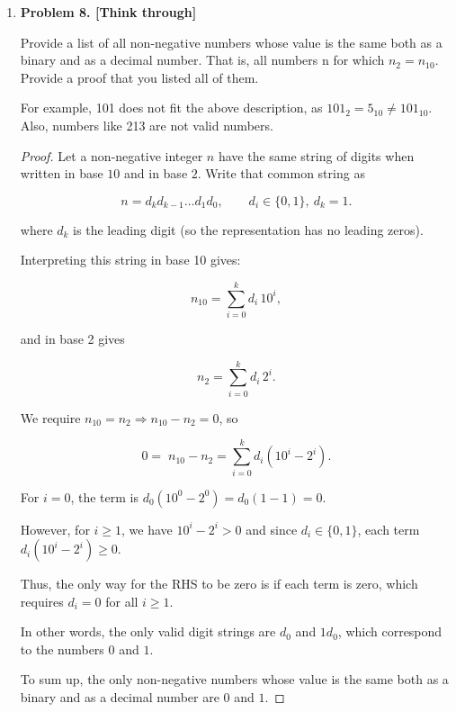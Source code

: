 \documentclass[11pt]{article}
\begin{document}
\begin{enumerate}
\begin{proof}
The infinite sum evaluates to
\[
\sum_{k=0}^{\infty} \frac{k+1}{2^k} = 4,
\]
so
\[
T(n) \leq 4n.
\]

On the other hand, each increment costs at least \(1\), so \(T(n) \geq n\).  
Thus,
\[
T(n) = \Theta(n).
\]

Finally, the amortized cost per increment is
\[
\frac{T(n)}{n} = \Theta(1),
\]
with an explicit upper bound of \(4\) units per increment.
\end{proof}

\item
\textbf{Problem 8. [Think through]}

Provide a list of all non-negative numbers whose value is the same both as a binary and as a decimal number. That is, all numbers n for which \(n_2 = n_{10}\). Provide a proof that you listed all of them.

For example, 101 does not fit the above description, as \(101_{2} = 5_{10} \neq 101_{10}\). Also, numbers like 213 are not valid numbers.

\begin{proof}

Let a non-negative integer \(n\) have the same string of digits when written in base \(10\) and in base \(2\). Write that common string as

\[
n = d_kd_{k-1}\dots d_1d_0,\qquad d_i\in\{0,1\},\ d_k=1.
\]

where \(d_k\) is the leading digit (so the representation has no leading zeros).

Interpreting this string in base 10 gives:

\[
n_{10}=\sum_{i=0}^k d_i\,10^i,
\]

and in base 2 gives

\[
n_2=\sum_{i=0}^k d_i\,2^i.
\]

We require \(n_{10}=n_2 \Rightarrow n_{10} - n_2 = 0\), so

\[
0=\;n_{10}-n_2=\sum_{i=0}^k d_i(10^i-2^i).
\]

For \(i=0\), the term is \(d_0(10^0-2^0)=d_0(1-1)=0\).

However, for \(i\ge1\), we have \(10^i-2^i>0\) and since \(d_i\in\{0,1\}\), each term \(d_i(10^i-2^i)\ge0\).

Thus, the only way for the RHS to be zero is if each term is zero, which requires \(d_i=0\) for all \(i\ge1\).

In other words, the only valid digit strings are \(d_0\) and \(1d_0\), which correspond to the numbers \(0\) and \(1\).

To sum up, the only non-negative numbers whose value is the same both as a binary and as a decimal number are \(0\) and \(1\).

\end{proof}


\end{enumerate}
\end{document}
